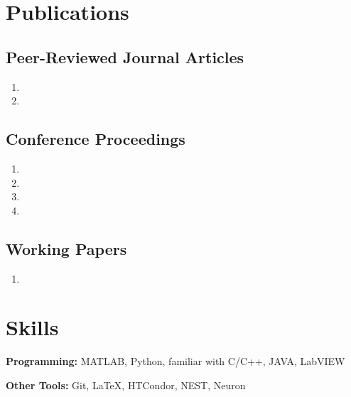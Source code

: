 \documentclass[10pt,letterpaper]{article}
\begin{document}
\vspace{-0.25in}

\section*{Publications}
\vspace{-0.05in}


\subsection*{Peer-Reviewed Journal Articles}

\begin{enumerate}
\item {}
\item {}
\end{enumerate}

\subsection*{Conference Proceedings}

\begin{enumerate}[resume]
\item {}
\item {}
\item {}
\item {}
\end{enumerate}

\subsection*{Working Papers}
\begin{enumerate}[resume]
\item {}
\end{enumerate}

\vspace{-0.25in}

\section*{Skills}
\vspace{-0.05in}
\hspace{1.5em}\textbf{Programming:} MATLAB, Python, familiar with C/C++, JAVA, LabVIEW

\hspace{1.5em}\textbf{Other Tools:} Git, \LaTeX, HTCondor, NEST, Neuron
\end{document}
